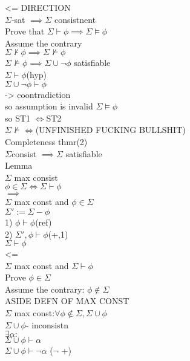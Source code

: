 \documentclass[12pt,oneside,notitlepage]{book}
\theoremstyle{definition}
\begin{document}
<= DIRECTION \\
$\Sigma$-sat $\implies \Sigma$ consistnent \\
Prove that $\Sigma \vdash \phi \implies \Sigma \vDash \phi$ \\
Assume the contrary \\
$\Sigma \not \vdash \phi \implies \Sigma \not \vDash \phi$ \\
$\Sigma \not \vDash \phi \implies \Sigma \cup { \neg \phi }$ satisfiable \\
$\Sigma \vdash \phi $(hyp) \\
$\Sigma \cup { \neg \phi } \vdash \phi $ \\
-> coontradiction \\
so assumption is invalid $\Sigma \vDash \phi$ \\
so ST1 $\iff $ST2 \\
$\Sigma \not \vDash \iff $(UNFINISHED FUCKING BULLSHIT) \\

Completeness thmr(2) \\
$\Sigma $consist $\implies \Sigma$ satisfiable \\

Lemma \\
$\Sigma$ max consist \\
$\phi \in \Sigma \iff \Sigma \vdash \phi$ \\
$\implies $ \\
$\Sigma$ max const and $\phi \in \Sigma$ \\
$\Sigma' := \Sigma - { \phi} $ \\
1) $\phi \vdash \phi $(ref) \\
2) $\Sigma', \phi \vdash \phi $(+,1) \\
$\Sigma \vdash \phi$ \\

<= \\
$\Sigma$ max const and $\Sigma \vdash \phi$ \\
Prove $\phi \in \Sigma $ \\
Assume the contrary: $\phi \not \in \Sigma$ \\

ASIDE DEFN OF MAX CONST \\
$\Sigma$ max const:$ \forall \phi \not \in \Sigma, \Sigma \cup {\phi} $ \\
$\Sigma \cup {\phi} $- inconsistn \\
$\exists \alpha:$ \\
$\Sigma \cup { \phi} \vdash \alpha$ \\
$\Sigma \cup { \phi} \vdash \neg \alpha$ ($\neg$ +) \\
 
\end{document}
